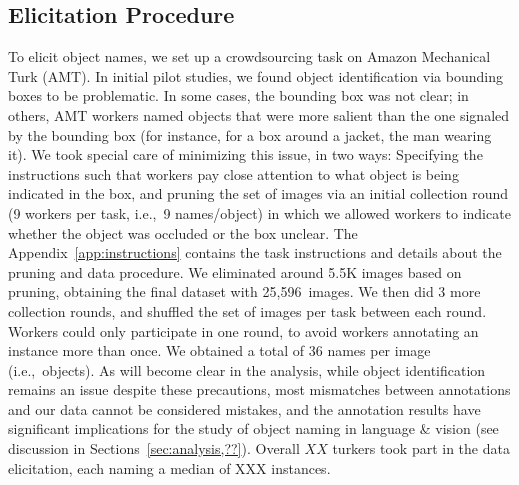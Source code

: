 \subsection{Elicitation Procedure}
\label{ssec:elicitation}
To elicit object names, we set up a crowdsourcing task on Amazon Mechanical Turk (AMT).
In initial pilot studies, we found object identification via bounding boxes to be problematic.
In some cases, the bounding box was not clear; in others, AMT workers named objects that were more salient than the one signaled by the bounding box (for instance, for a box around a jacket, the man wearing it).
We took special care of minimizing this issue, in two ways: Specifying the instructions such that workers pay close attention to what object is being indicated in the box, and pruning the set of images via an initial collection round (9 workers per task, i.e.,\ 9 names/object) in which we allowed workers to indicate whether the object was occluded or the box unclear.
The Appendix~\ref{app:instructions} contains the task instructions and details about the pruning and data procedure.
We eliminated around 5.5K images based on pruning, obtaining the final dataset with 25,596\ images.
We then did 3 more collection rounds, and shuffled the set of images per task between each round. 
Workers could only participate in one round, to avoid workers annotating an instance more than once. 
We obtained a total of 36 names per image (i.e.,\ objects).
As will become clear in the analysis, while object identification remains an issue despite these precautions, most mismatches between \vg annotations  and our data cannot be considered mistakes, and the annotation results have significant implications for the study of object naming in language \& vision (see discussion in Sections~\ref{sec:analysis,??}).
Overall $XX$ turkers took part in the data elicitation, each naming a median of XXX instances. 

